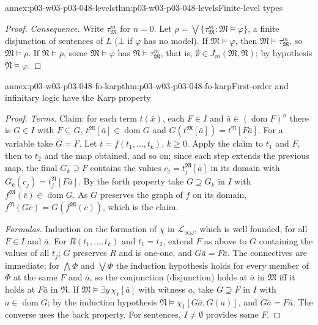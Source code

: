 \begin{annexitem}{annex:p03-w03-p03-048-levels}{thm:p03-w03-p03-048-levels}{Finite-level types}
\begin{proof}
\emph{Consequence.}  Write \(\tau^m_{\mathfrak M}\) for \(n=0\).  Let
\(\rho=\bigvee\{\tau^m_{\mathfrak M}:\mathfrak M\models\varphi\}\), a finite
disjunction of sentences of \(L\) (\(\bot\) if \(\varphi\) has no model).
If \(\mathfrak M\models\varphi\), then \(\mathfrak M\models\tau^m_{\mathfrak
M}\), so \(\mathfrak M\models\rho\).  If \(\mathfrak N\models\rho\), some
\(\mathfrak M\models\varphi\) has \(\mathfrak N\models\tau^m_{\mathfrak M}\),
that is, \(\emptyset\in J_m(\mathfrak M,\mathfrak N)\); by hypothesis
\(\mathfrak N\models\varphi\).
\end{proof}
\end{annexitem}

\begin{annexitem}{annex:p03-w03-p03-048-fo-karp}{thm:p03-w03-p03-048-fo-karp}{First-order and infinitary logic have the Karp property}
\begin{proof}
\emph{Terms.}  Claim: for each term \(t(\bar x)\), each \(F\in I\) and
\(\bar a\in(\operatorname{dom}F)^{n}\) there is \(G\in I\) with
\(F\subseteq G\), \(t^{\mathfrak M}[\bar a]\in\operatorname{dom}G\) and
\(G(t^{\mathfrak M}[\bar a])=t^{\mathfrak N}[F\bar a]\).  For a variable take
\(G=F\).  Let \(t=f(t_1,\ldots,t_k)\), \(k\geq0\).  Apply the claim to
\(t_1\) and \(F\), then to \(t_2\) and the map obtained, and so on; since
each step extends the previous map, the final \(G_k\supseteq F\) contains
the values \(c_j=t_j^{\mathfrak M}[\bar a]\) in its domain with
\(G_k(c_j)=t_j^{\mathfrak N}[F\bar a]\).  By the forth property take
\(G\supseteq G_k\) in \(I\) with \(f^{\mathfrak M}(\bar c)\in
\operatorname{dom}G\).  As \(G\) preserves the graph of \(f\) on its domain,
\(f^{\mathfrak N}(G\bar c)=G(f^{\mathfrak M}(\bar c))\), which is the claim.

\emph{Formulas.}  Induction on the formation of \(\chi\) in
\(\mathcal L_{\infty\omega}\), which is well founded, for all \(F\in I\) and
\(\bar a\).
For \(R(t_1,\ldots,t_k)\) and \(t_1=t_2\), extend \(F\) as above to \(G\)
containing the values of all \(t_j\); \(G\) preserves \(R\) and is one-one,
and \(G\bar a=F\bar a\).  The connectives are immediate; for
\(\bigwedge\Phi\) and \(\bigvee\Phi\) the induction hypothesis holds for
every member of \(\Phi\) at the same \(F\) and \(\bar a\), so the conjunction
(disjunction) holds at \(\bar a\) in \(\mathfrak M\) iff it holds at
\(F\bar a\) in \(\mathfrak N\).  If
\(\mathfrak M\models\exists y\,\chi_1[\bar a]\) with witness \(a\), take
\(G\supseteq F\) in \(I\) with \(a\in\operatorname{dom}G\); by the induction
hypothesis \(\mathfrak N\models\chi_1[G\bar a,G(a)]\), and \(G\bar a=F\bar
a\).  The converse uses the back property.  For sentences, \(I\neq\emptyset\)
provides some \(F\).
\end{proof}
\end{annexitem}

